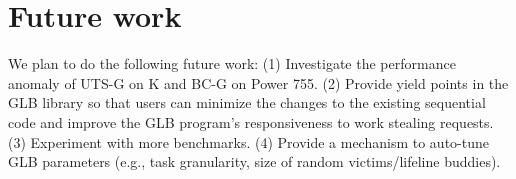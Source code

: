 \section{Future work}
We plan to do the following future work: 
(1) Investigate the performance anomaly of UTS-G on K and BC-G on Power 755.
(2) Provide yield points in the GLB library so that users can minimize the changes to the existing sequential code and improve the GLB program's responsiveness to work stealing requests.
(3) Experiment with more benchmarks.
(4) Provide a mechanism to auto-tune GLB parameters (e.g., task granularity, size of random victims/lifeline buddies).


